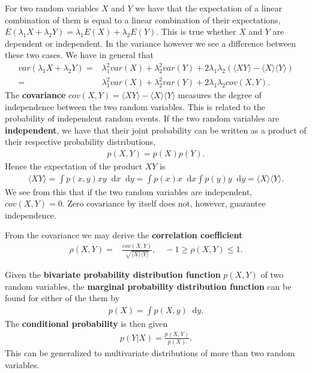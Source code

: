\documentclass[twoside,english]{uiofysmaster}
\newcommand*\dif{\mathop{}\!\mathrm{d}}
\begin{document}
For two random variables $X$ and $Y$ we have that the expectation of a
linear combination of them is equal to a linear combination of their
expectations, $E(\lambda_1 X + \lambda_2 Y) = \lambda_1 E(X) +
\lambda_2 E(Y)$. This is true whether $X$ and $Y$ are dependent or
independent. In the variance however we see a difference between these
two cases. We have in general that
\begin{align}
	var(\lambda_1 X + \lambda_2 Y) =& \lambda_1^2 var(X) + \lambda_2^2 var(Y) + 2 \lambda_1 \lambda_2 ( \langle XY \rangle
	- \langle X \rangle \langle Y \rangle) \\
	=& \lambda_1^2 var(X) + \lambda_2^2 var(Y) + 2 \lambda_1 \lambda_2 cov (X, Y).
\end{align}
The \textbf{covariance} $cov(X, Y) = \langle XY \rangle - \langle X
\rangle \langle Y \rangle$ measures the degree of independence between
the two random variables. This is related to the probability of
independent random events. If the two random variables are
\textbf{independent}, we have that their joint probability can be
written as a product of their respective probability distributions,
\begin{align}
	p(X, Y) = p(X) p(Y) .
\end{align}
Hence the expectation of the product $XY$ is
\begin{align}
	\langle XY \rangle = \int p(x, y) xy \dif x \dif y = \int p(x) x \dif x \int p(y) y \dif y
	=\langle X \rangle \langle Y \rangle.
\end{align}
We see from this that if the two random variables are independent,
$cov(X,Y) = 0$. Zero covariance by itself does not, however, guarantee
independence.

From the covariance we may derive the \textbf{correlation coefficient}
\begin{align}
	\rho(X,Y) =& \frac{cov(X,Y)}{\sqrt{ \langle X \rangle \langle Y \rangle }}, \quad
	-1 \geq \rho(X,Y) \leq 1.
\end{align}

Given the \textbf{bivariate probability distribution function}
$p(X,Y)$ of two random variables, the \textbf{marginal probability
  distribution function} can be found for either of the them by
\begin{align}
	p(X) = \int p(X,y) \dif y.
\end{align}
The \textbf{conditional probability} is then given
\begin{align}
	p(Y|X) = \frac{p(X,Y)}{p(X)}.
\end{align}
This can be generalized to multivariate distributions of more than two random variables.
\end{document}
